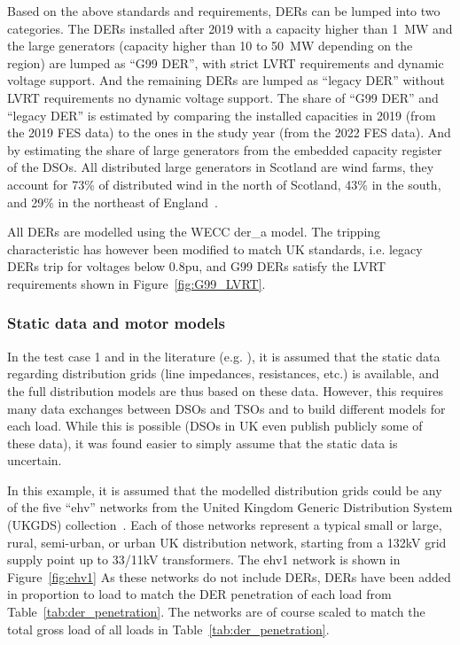 Based on the above standards and requirements, DERs can be lumped into two categories. The DERs installed after 2019 with a capacity higher than 1~MW and the large generators (capacity higher than 10 to 50~MW depending on the region) are lumped as ``G99 DER'', with strict LVRT requirements and dynamic voltage support. And the remaining DERs are lumped as ``legacy DER'' without LVRT requirements no dynamic voltage support. The share of ``G99 DER'' and ``legacy DER'' is estimated by comparing the installed capacities in 2019 (from the 2019 FES data) to the ones in the study year (from the 2022 FES data). And by estimating the share of large generators from the embedded capacity register of the DSOs. All distributed large generators in Scotland are wind farms, they account for 73\% of distributed wind in the north of Scotland, 43\% in the south, and 29\% in the northeast of England~\cite{capacity_register_northern_powergrid, capacity_register_ssen, capacity_register_sp}.

All DERs are modelled using the WECC der\_a model. The tripping characteristic has however been modified to match UK standards, i.e. legacy DERs trip for voltages below 0.8pu, and G99 DERs satisfy the LVRT requirements shown in Figure~\ref{fig:G99_LVRT}.

\subsubsection{Static data and motor models}
\label{sec:CIGRE_distrib_static}

In the test case 1 and in the literature (e.g. \cite{ChaspierrePaper, ChaspierreThesis, Vorwerk}), it is assumed that the static data regarding distribution grids (line impedances, resistances, etc.) is available, and the full distribution models are thus based on these data. However, this requires many data exchanges between DSOs and TSOs and to build different models for each load. While this is possible (DSOs in UK even publish publicly some of these data), it was found easier to simply assume that the static data is uncertain.

In this example, it is assumed that the modelled distribution grids could be any of the five ``ehv'' networks from the United Kingdom Generic Distribution System (UKGDS) collection~\cite{UKGDS}. Each of those networks represent a typical small or large, rural, semi-urban, or urban UK distribution network, starting from a 132kV grid supply point up to 33/11kV transformers. The ehv1 network is shown in Figure~\ref{fig:ehv1} As these networks do not include DERs, DERs have been added in proportion to load to match the DER penetration of each load from Table~\ref{tab:der_penetration}. The networks are of course scaled to match the total gross load of all loads in Table~\ref{tab:der_penetration}.

